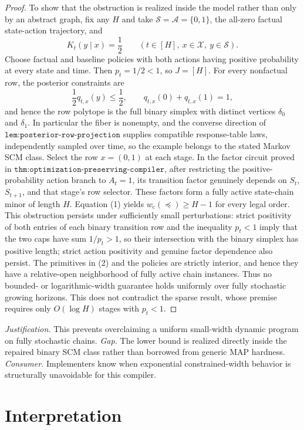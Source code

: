 \documentclass{article}
\begin{document}
\begin{proof}
To show that the obstruction is realized inside the model rather than only by an abstract graph, fix any \(H\) and take \(\mathcal S=\mathcal A=\{0,1\}\), the all-zero factual state-action trajectory, and
\[
 K_t(y\mid x)=\frac12
 \qquad(t\in[H],\ x\in\mathcal X,\ y\in\mathcal S).
 \tag{2}
\]
Choose factual and baseline policies with both actions having positive probability at every state and time.  Then \(p_t=1/2<1\), so \(J=[H]\).  For every nonfactual row, the posterior constraints are
\[
 \frac12q_{t,x}(y)\le\frac12,
 \qquad q_{t,x}(0)+q_{t,x}(1)=1,
\]
and hence the row polytope is the full binary simplex with distinct vertices \(\delta_0\) and \(\delta_1\).  In particular the fiber is nonempty, and the converse direction of \(\texttt{lem:posterior-row-projection}\) supplies compatible response-table laws, independently sampled over time, so the example belongs to the stated Markov SCM class.  Select the row \(x=(0,1)\) at each stage.  In the factor circuit proved in \(\texttt{thm:optimization-preserving-compiler}\), after restricting the positive-probability action branch to \(A_t=1\), its transition factor genuinely depends on \(S_t\), \(S_{t+1}\), and that stage's row selector.  These factors form a fully active state-chain minor of length \(H\).  Equation (1) yields \(w_{\mathrm c}(\preceq)\ge H-1\) for every legal order.  This obstruction persists under sufficiently small perturbations: strict positivity of both entries of each binary transition row and the inequality \(p_t<1\) imply that the two caps have sum \(1/p_t>1\), so their intersection with the binary simplex has positive length; strict action positivity and genuine factor dependence also persist.  The primitives in (2) and the policies are strictly interior, and hence they have a relative-open neighborhood of fully active chain instances.  Thus no bounded- or logarithmic-width guarantee holds uniformly over fully stochastic growing horizons.  This does not contradict the sparse result, whose premise requires only \(O(\log H)\) stages with \(p_t<1\).
\end{proof}
\par\smallskip\noindent \textit{Justification.} This prevents overclaiming a uniform small-width dynamic program on fully stochastic chains. \textit{Gap.} The lower bound is realized directly inside the repaired binary SCM class rather than borrowed from generic MAP hardness. \textit{Consumer.} Implementers know when exponential constrained-width behavior is structurally unavoidable for this compiler.

\section{Interpretation}
\end{document}
